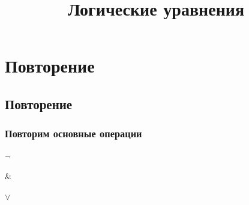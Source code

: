 \documentclass[compress,red]{beamer}
\title{Логические уравнения}
\begin{document}
\maketitle

\section{Повторение}

\subsection{Повторение}
\begin{frame}[fragile]
  \frametitle{Повторим основные операции}
  \begin{center}
    \Huge{$\neg$}
  \end{center}
  \begin{center}
    \Huge{$\&$}
  \end{center}
  \begin{center}
    \Huge{$\vee$}
  \end{center}
\end{frame}
\end{document}
